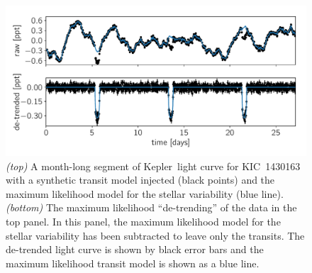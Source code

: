\documentclass[manuscript, letterpaper]{aastex6}
\newcommand{\project}[1]{\textsf{#1}}
\newcommand{\kepler}{\project{Kepler}}
\newcommand{\figurelabel}[1]{\label{fig:#1}}
\begin{document}
\begin{figure}[!htbp]
\begin{center}
\includegraphics[width=\textwidth]{figures/transit-ml.pdf}
    \caption{\emph{(top)} A month-long segment of \kepler\ light curve for
    KIC~1430163 with a synthetic transit model injected (black points) and the
    maximum likelihood model for the stellar variability
    (blue line).
    \emph{(bottom)} The maximum likelihood ``de-trending'' of the data in
    the top panel.
    In this panel, the maximum likelihood model for the stellar variability
    has been subtracted to leave only the transits.
    The de-trended light curve is shown by black error bars and the maximum
    likelihood transit model is shown as a blue line.
    \figurelabel{transit-ml}}
\end{center}
\end{figure}
\end{document}
